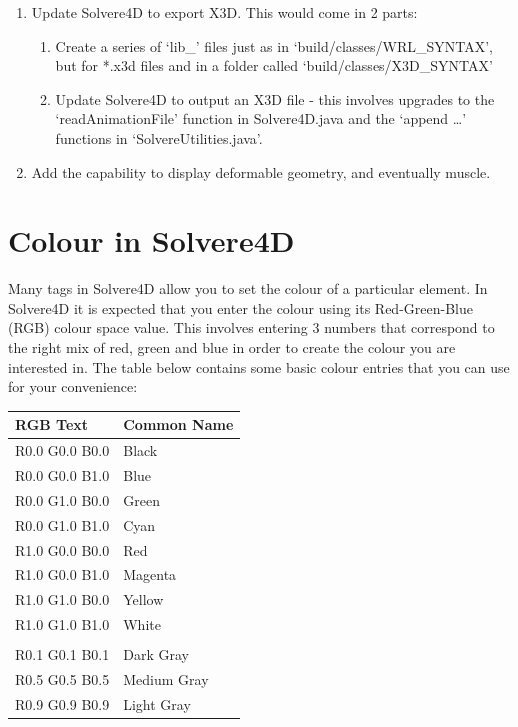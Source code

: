 \documentclass[singlecolumn,12pt]{article}
\begin{document}
\begin{enumerate}
\item Update Solvere4D to export X3D. This would come in 2 parts:

\begin{enumerate}
\item Create a series of `lib\_' files just as in
`build/classes/WRL\_SYNTAX', but for *.x3d files and in a folder
called `build/classes/X3D\_SYNTAX'
\item Update Solvere4D to output an X3D file - this involves
upgrades to the `readAnimationFile' function in Solvere4D.java and
the `append \ldots' functions in `SolvereUtilities.java'.
\end{enumerate}

\item Add the capability to display deformable geometry, and
eventually muscle.

\end{enumerate}





\appendix
\newpage
\section{Colour in Solvere4D}
\label{app_colour} Many tags in Solvere4D allow you to set the
colour of a particular element. In Solvere4D it is expected that you
enter the colour using its Red-Green-Blue (RGB) colour space value.
This involves entering 3 numbers that correspond to the right mix of
red, green and blue in order to create the colour you are interested
in. The table below contains some basic colour entries that you can
use for your convenience:

\vspace{1cm}

\begin{tabular}{l l}
\hline RGB Text & Common Name \\
\hline R0.0 G0.0 B0.0 & Black \\
R0.0 G0.0 B1.0 & Blue \\
R0.0 G1.0 B0.0 & Green \\
R0.0 G1.0 B1.0 & Cyan \\
R1.0 G0.0 B0.0 & Red \\
R1.0 G0.0 B1.0 & Magenta \\
R1.0 G1.0 B0.0 & Yellow \\
R1.0 G1.0 B1.0 & White \\
&  \\
R0.1 G0.1 B0.1 & Dark Gray\\
R0.5 G0.5 B0.5 & Medium Gray\\
R0.9 G0.9 B0.9 & Light Gray\\
\end{tabular}
\end{document}
